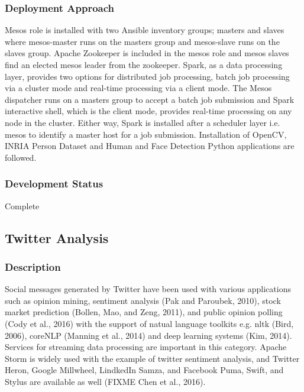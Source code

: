 \documentclass[9pt,twocolumn,twoside]{styles/osajnl}
\begin{document}
\subsubsection{Deployment Approach}

Mesos role is installed with two Ansible inventory groups; masters and
slaves where mesos-master runs on the masters group and mesos-slave
runs on the slaves group. Apache Zookeeper is included in the mesos
role and mesos slaves find an elected mesos leader from the
zookeeper. Spark, as a data processing layer, provides two options for
distributed job processing, batch job processing via a cluster mode
and real-time processing via a client mode. The Mesos dispatcher runs
on a masters group to accept a batch job submission and Spark
interactive shell, which is the client mode, provides real-time
processing on any node in the cluster. Either way, Spark is installed
after a scheduler layer i.e. mesos to identify a master host for a job
submission. Installation of OpenCV, INRIA Person Dataset and Human and
Face Detection Python applications are followed.

\subsubsection{Development Status}

Complete



\subsection{Twitter Analysis}

\subsubsection{Description}

Social messages generated by Twitter have been used with various
applications such as opinion mining, sentiment analysis (Pak and
Paroubek, 2010), stock market prediction (Bollen, Mao, and Zeng,
2011), and public opinion polling (Cody et al., 2016) with the support
of natual language toolkits e.g. nltk (Bird, 2006), coreNLP (Manning
et al., 2014) and deep learning systems (Kim, 2014). Services for
streaming data processing are important in this category. Apache Storm
is widely used with the example of twitter sentiment analysis, and
Twitter Heron, Google Millwheel, LindkedIn Samza, and Facebook Puma,
Swift, and Stylus are available as well (FIXME Chen et al., 2016).
\end{document}
